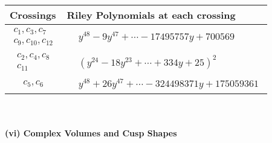 \documentclass[1p]{elsarticle_modified}
\theoremstyle{definition}
\begin{document}
\begin{tabular}{m{50pt}|m{274pt}}
Crossings & \hspace{64pt}Riley Polynomials at each crossing \\
\hline $$\begin{aligned}c_{1},c_{3},c_{7}\\c_{9},c_{10},c_{12}\end{aligned}$$&$\begin{aligned}
&y^{48}-9 y^{47}+\cdots-17495757 y+700569
\end{aligned}$\\
\hline $$\begin{aligned}c_{2},c_{4},c_{8}\\c_{11}\end{aligned}$$&$\begin{aligned}
&(y^{24}-18 y^{23}+\cdots+334 y+25)^{2}
\end{aligned}$\\
\hline $$\begin{aligned}c_{5},c_{6}\end{aligned}$$&$\begin{aligned}
&y^{48}+26 y^{47}+\cdots-324498371 y+175059361
\end{aligned}$\\
\hline
\end{tabular}\\~\\
\newpage\flushleft \textbf{(vi) Complex Volumes and Cusp Shapes}
\end{document}
